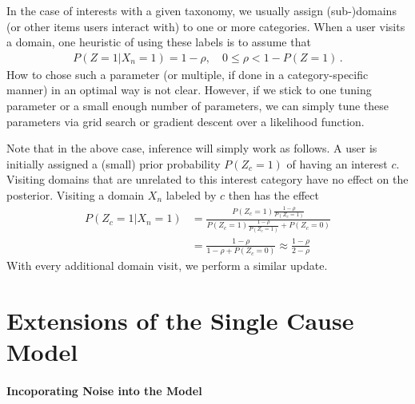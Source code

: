 \documentclass{article}
\begin{document}
In the case of interests with a given taxonomy, we usually assign (sub-)domains (or other items users interact with) to one or more categories. When a user visits a domain, one heuristic of using these labels is to assume that 
\begin{align}
P(Z=1 | X_n=1) = 1-\rho, \quad 0 \leq \rho  < 1-P(Z=1) \,.
\end{align}
How to chose such a parameter (or multiple, if done in a category-specific manner) in an optimal way is not clear. However, if we stick to one tuning parameter or a small enough number of parameters, we can simply tune these parameters via grid search or gradient descent over a likelihood function.

Note that in the above case, inference will simply work as follows. A user is initially assigned a (small) prior probability $P(Z_c=1)$ of having an interest $c$. Visiting domains that are unrelated to this interest category have no effect on the posterior. Visiting a domain $X_n$ labeled by $c$ then has the effect 
\begin{align}
P(Z_c=1 | X_n=1) & = \frac{P(Z_c=1) \frac{1-\rho}{P(Z_c=1)}}{
P(Z_c=1) \frac{1-\rho}{P(Z_c=1)} + P(Z_c=0)} \nonumber \\
& = \frac{1-\rho}{1-\rho + P(Z_c=0)} \approx 
\frac{1-\rho}{2-\rho}
\end{align}
With every additional domain visit, we perform a similar update. 


\section{Extensions of the Single Cause Model}

\paragraph{Incoporating Noise into the Model}
\end{document}
